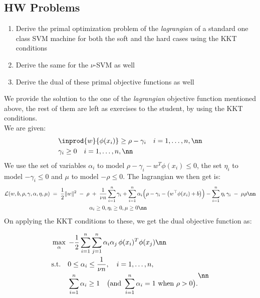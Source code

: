 \documentclass[11pt]{report}
\begin{document}
\subsection{HW Problems}
\begin{enumerate}
    \item Derive the primal optimization problem of the \emph{lagrangian} of a standard one class SVM machine for both the soft and the hard cases using the KKT conditions
    \item Derive the same for the \(\nu\)-SVM as well
    \item Derive the dual of these primal objective functions as well
\end{enumerate}
\vspace{1mm}
We provide the solution to the one of the \emph{lagrangian} objective function mentioned above, the rest of them are left as exercises to the student, by using the KKT conditions.\\
We are given:
\begin{align}
    & \inprod{w}{\phi(x_i)} \geq \rho - \gamma_i \quad i=1,\ldots,n, \nn \\
    & \gamma_i \geq 0 \quad i=1,\ldots,n, \nn
\end{align}
We use the set of variables \(\alpha_i\) to model \(\rho - \gamma_i - w^T\phi(x_i) \leq 0\), the set \(\eta_i\) to model \(-\gamma_i \leq 0\) and \(\mu\) to model \(-\rho \leq 0\). The lagrangian we then get is:
\begin{align}
     \mathcal{L}(w,b,\rho,\gamma,\alpha,\eta,\mu) \;=\;
\frac{1}{2}\|w\|^2 \;-\; \rho & \;+\; \frac{1}{\nu n} \sum_{i=1}^n \gamma_i
+ \sum_{i=1}^n \alpha_i \Big( \rho - \gamma_i -\big( w^\top \phi(x_i) + b \big) \Big)
- \sum_{i=1}^n \eta_i \, \gamma_i \;-\; \mu \rho \nn \\
    \vspace{1mm}
    & \alpha_i \geq 0, \eta_i \geq 0, \mu \geq 0 \nn
\end{align}
\vspace{1mm}
On applying the KKT conditions to these, we get the dual objective function as:

\begin{align}
    & \max_{\alpha}\;
-\frac{1}{2}\sum_{i=1}^n\sum_{j=1}^n
    \alpha_i \alpha_j\, \phi(x_i)^T\phi(x_j) \nn \\
    & \begin{aligned}
\text{s.t.}\quad
& 0 \le \alpha_i \le \frac{1}{\nu n}, \quad i=1,\dots,n,\\
& \sum_{i=1}^n \alpha_i \ge 1
\quad\big(\text{and } \sum_{i=1}^n \alpha_i = 1 \text{ when } \rho>0\big).
\end{aligned} \nn 
\end{align}
\end{document}
